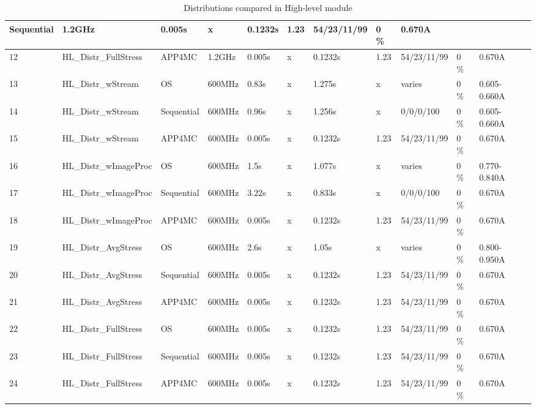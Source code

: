 {\begin{table}[!ht]
{\begin{tabular}{|l|l|l|l|l|l|l|l|l|l|l|}
				Sequential &
				1.2GHz &
				0.005s &
				x &
				0.1232s &
				1.23 &
				54/23/11/99 &
				0 \% &
				0.670A \\
				\hline
				12 &
				HL{\_}Distr{\_}FullStress &
				APP4MC &
				1.2GHz &
				0.005s &
				x &
				0.1232s &
				1.23 &
				54/23/11/99 &
				0 \% &
				0.670A \\
				\hline
				13 &
				HL{\_}Distr{\_}wStream &
				OS &
				600MHz &
				0.83s &
				x &
				1.275s &
				x &
				varies &
				0 \% &
				0.605-0.660A \\
				\hline
				14 &
				HL{\_}Distr{\_}wStream &
				Sequential &
				600MHz &
				0.96s &
				x &
				1.256s &
				x &
				0/0/0/100 &
				0 \% &
				0.605-0.660A \\
				\hline
				15 &
				HL{\_}Distr{\_}wStream &
				APP4MC &
				600MHz &
				0.005s &
				x &
				0.1232s &
				1.23 &
				54/23/11/99 &
				0 \% &
				0.670A \\
				\hline
				16 &
				HL{\_}Distr{\_}wImageProc &
				OS &
				600MHz &
				1.5s &
				x &
				1.077s &
				x &
				varies&
				0 \% &
				0.770-0.840A \\
				\hline
				17 &
				HL{\_}Distr{\_}wImageProc &
				Sequential &
				600MHz &
				3.22s &
				x &
				0.833s &
				x &
				0/0/0/100 &
				0 \% &
				0.670A \\
				\hline
				18 &
				HL{\_}Distr{\_}wImageProc &
				APP4MC &
				600MHz &
				0.005s &
				x &
				0.1232s &
				1.23 &
				54/23/11/99 &
				0 \% &
				0.670A \\
				\hline
				19 &
				HL{\_}Distr{\_}AvgStress &
				OS &
				600MHz &
				2.6s &
				x &
				1.05s &
				x &
				varies  &
				0 \% &
				0.800-0.950A \\
				\hline
				20 &
				HL{\_}Distr{\_}AvgStress &
				Sequential &
				600MHz &
				0.005s &
				x &
				0.1232s &
				1.23 &
				54/23/11/99 &
				0 \% &
				0.670A \\
				\hline
				21 &
				HL{\_}Distr{\_}AvgStress &
				APP4MC &
				600MHz &
				0.005s &
				x &
				0.1232s &
				1.23 &
				54/23/11/99 &
				0 \% &
				0.670A \\
				\hline
				22 &
				HL{\_}Distr{\_}FullStress &
				OS &
				600MHz &
				0.005s &
				x &
				0.1232s &
				1.23 &
				54/23/11/99 &
				0 \% &
				0.670A \\
				\hline
				23 &
				HL{\_}Distr{\_}FullStress &
				Sequential &
				600MHz &
				0.005s &
				x &
				0.1232s &
				1.23 &
				54/23/11/99 &
				0 \% &
				0.670A \\
				\hline
				24 &
				HL{\_}Distr{\_}FullStress &
				APP4MC &
				600MHz &
				0.005s &
				x &
				0.1232s &
				1.23 &
				54/23/11/99 &
				0 \% &
				0.670A \\
				\hline
			\end{tabular}
			}
			\caption{Distributions compared in High-level module}
			\label{tbl_hlcomparison}
		\end{table}
}

